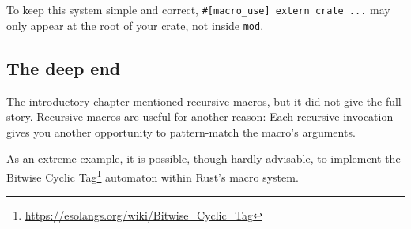 \documentclass[a4paper,]{book}
\newenvironment{Shaded}{\begin{snugshade}}{\end{snugshade}}
\newcommand{\DecValTok}[1]{\textcolor[rgb]{0.00,0.00,0.81}{{#1}}}
\newcommand{\CommentTok}[1]{\textcolor[rgb]{0.56,0.35,0.01}{\textit{{#1}}}}
\newcommand{\OtherTok}[1]{\textcolor[rgb]{0.56,0.35,0.01}{{#1}}}
\newcommand{\NormalTok}[1]{{#1}}
\renewcommand{\href}[2]{#2\footnote{\url{#1}}}
\begin{document}
To keep this system simple and correct,
\texttt{\#{[}macro\_use{]}\ extern\ crate\ ...} may only appear at the
root of your crate, not inside \texttt{mod}.

\subsection{The deep end}\label{the-deep-end}

The introductory chapter mentioned recursive macros, but it did not give
the full story. Recursive macros are useful for another reason: Each
recursive invocation gives you another opportunity to pattern-match the
macro's arguments.

As an extreme example, it is possible, though hardly advisable, to
implement the
\href{https://esolangs.org/wiki/Bitwise_Cyclic_Tag}{Bitwise Cyclic Tag}
automaton within Rust's macro system.

\begin{Shaded}
\end{Shaded}
\end{document}
